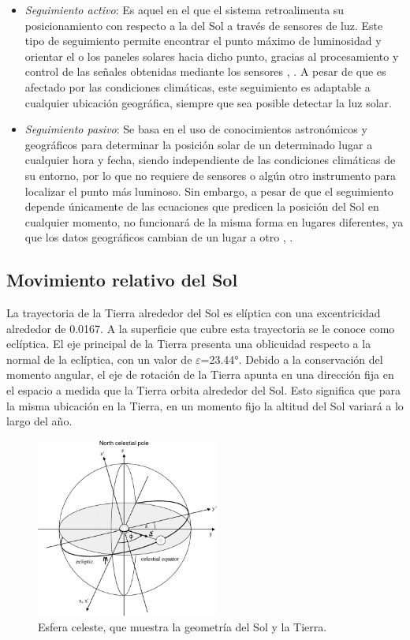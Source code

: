 \begin{itemize}
	\item \textit{Seguimiento activo}: Es aquel en el que el sistema retroalimenta su posicionamiento con respecto a la del Sol a través de sensores de luz. Este tipo de seguimiento permite encontrar el punto máximo de luminosidad y orientar el o los paneles solares hacia dicho punto, gracias al procesamiento y control de las señales obtenidas mediante los sensores \cite{M4}, \cite{M9}. A pesar de que es afectado por las condiciones climáticas, este seguimiento es adaptable a cualquier ubicación geográfica, siempre que sea posible detectar la luz solar.
	\item \textit{Seguimiento pasivo}: Se basa en el uso de conocimientos astronómicos y geográficos para determinar la posición solar de un determinado lugar a cualquier hora y fecha, siendo independiente de las condiciones climáticas de su entorno, por lo que no requiere de sensores o algún otro instrumento para localizar el punto más luminoso. Sin embargo, a pesar de que el seguimiento depende únicamente de las ecuaciones que predicen la posición del Sol en cualquier momento, no funcionará de la misma forma en lugares diferentes, ya que los datos geográficos cambian de un lugar a otro \cite{M4}, \cite{M9}.
\end{itemize}

\newpage
\subsection{Movimiento relativo del Sol}
La trayectoria de la Tierra alrededor del Sol es elíptica con una excentricidad alrededor de 0.0167. A la superficie que cubre esta trayectoria se le conoce como eclíptica. El eje principal de la Tierra presenta una oblicuidad respecto a la normal de la eclíptica, con un valor de $\varepsilon$=23.44°. Debido a la conservación del momento angular, el eje de rotación de la Tierra apunta en una dirección fija en el espacio a medida que la Tierra orbita alrededor del Sol. Esto significa que para la misma ubicación en la Tierra, en un momento fijo la altitud del Sol variará a lo largo del año.\\

\begin{figure}[H]
	\centering
	\includegraphics[width=6cm]{imagenes/ecliptica}
	\caption{Esfera celeste, que muestra la geometría del Sol y la Tierra.}
	\label{fig:ecliptica}
\end{figure}

